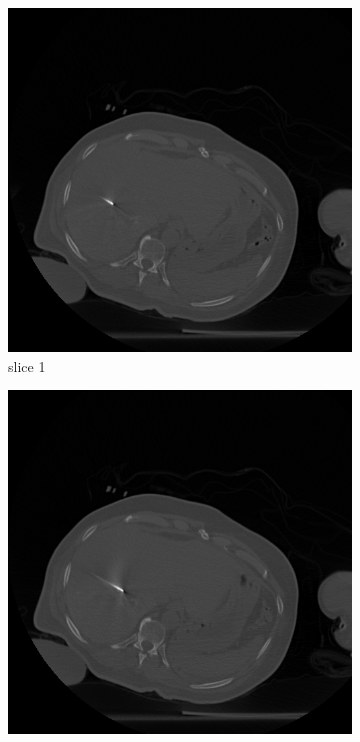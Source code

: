 \documentclass[journal]{IEEEtran}
\begin{document}
\begin{figure}[h!]
    \begin{subfigure}[b]{0.24\linewidth}
        \includegraphics[width=\textwidth]{../images/tmh/RFA2/template1.png}
 \caption{slice 1}
    \end{subfigure}
    \begin{subfigure}[b]{0.24\linewidth}
        \includegraphics[width=\textwidth]{../images/tmh/RFA2/template2.png}

\end{subfigure}
\end{figure}
\end{document}
